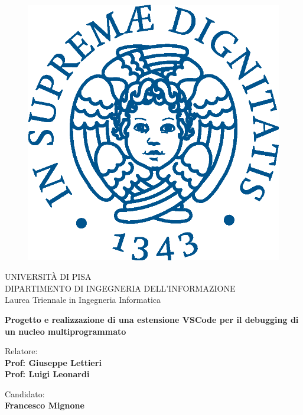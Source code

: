 \begin{titlepage}
\begin{figure}[!htb]
    \centering
    \includegraphics[keepaspectratio=true,scale=0.5]{images/cherubino.eps}
\end{figure}

\begin{center}
    \LARGE{UNIVERSITÀ DI PISA}
    \vspace{5mm}
    \\ \large{DIPARTIMENTO DI INGEGNERIA DELL'INFORMAZIONE}
    \vspace{5mm}
    \\ \LARGE{Laurea Triennale in Ingegneria Informatica}
\end{center}

\vspace{15mm}
\begin{center}
    {\LARGE{\bf Progetto e realizzazione di una estensione VSCode per il debugging di un nucleo multiprogrammato}}
    
\end{center}

\vspace{30mm}

\begin{minipage}[t]{0.47\textwidth}
	{\large{Relatore:}{\normalsize\vspace{3mm}
	\bf\\ \large{Prof: Giuseppe Lettieri} \normalsize\vspace{3mm}\bf \\ \large{Prof: Luigi Leonardi}}}
\end{minipage}
\hfill
\begin{minipage}[t]{0.47\textwidth}\raggedleft
	{\large{Candidato:}{\normalsize\vspace{3mm} \bf\\ \large{Francesco Mignone}}}
\end{minipage}

\vspace{30mm}
\hrulefill
\\

\end{titlepage}

